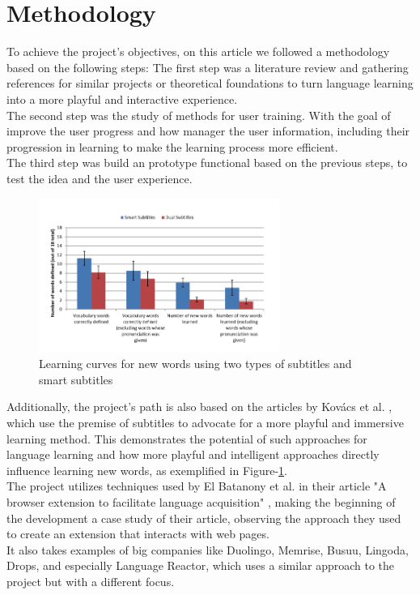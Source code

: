 \documentclass[12pt]{article}
\begin{document}
\section{Methodology}
To achieve the project's objectives, on this article we followed a methodology based on the following steps:
The first step was a literature review and gathering references for similar projects or theoretical foundations to turn language learning into a more playful and interactive experience. \\
The second step was the study of methods for user training. With the goal of improve the user progress and how manager the user information, including their progression in learning to make the learning process more efficient. \\
The third step was build an prototype functional based on the previous steps, to test the idea and the user experience. 
\begin{figure}[!h]
\centering
\caption{Learning curves for new words using two types of subtitles and smart subtitles}
\label{fig:my_label}
\includegraphics[width=0.7\textwidth]{assets/3.png}
\end{figure} 
Additionally, the project's path is also based on the articles by Kovács et al. \cite{Kovacs14}, which use the premise of subtitles to advocate for a more playful and immersive learning method. This demonstrates the potential of such approaches for language learning and how more playful and intelligent approaches directly influence learning new words, as exemplified in Figure-\ref{fig:my_label}. \\
The project utilizes techniques used by El Batanony et al. in their article "A browser extension to facilitate language acquisition" \cite{ElBatanony21}, making the beginning of the development a case study of their article, observing the approach they used to create an extension that interacts with web pages.  \\
It also takes examples of big companies like Duolingo, Memrise, Busuu, Lingoda, Drops, and especially Language Reactor, which uses a similar approach to the project but with a different focus.  \\
\end{document}
